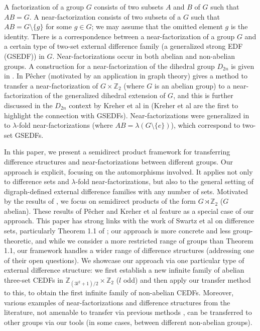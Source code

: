 \documentclass[12pt, a4paper]{article}
\theoremstyle{definition}
\begin{document}
A factorization of a group $G$ consists of two subsets $A$ and $B$ of $G$ such that $AB=G$. A near-factorization consists of two subsets of a $G$ such that $AB=G \setminus \{g\}$ for some $g \in G$; we may assume that the omitted element $g$ is the identity. There is a correspondence between a near-factorization of a group $G$ and a certain type of two-set external difference family (a generalized strong EDF (GSEDF)) in $G$.  Near-factorizations occur in both abelian and non-abelian groups.  A construction for a near-factorization of the dihedral group $D_{2n}$ is given in \cite{Caen}. In \cite{Pec} P\^{e}cher (motivated by an application in graph theory) gives a method to transfer a near-factorization of $G \times \mathbb{Z}_2$ (where $G$ is an abelian group) to a near-factorization of the generalized dihedral extension of $G$, and this is further discussed in the $D_{2n}$ context by Kreher et al in \cite{KrePatSti} (Kreher et al are the first to highlight the connection with GSEDFs). Near-factorizations were generalized in \cite{KreLiSti} to $\lambda$-fold near-factorizations (where $AB=\lambda(G \setminus \{e\})$), which correspond to two-set GSEDFs.

In this paper, we present a semidirect product framework for transferring difference structures and near-factorizations between different groups.  Our approach is explicit, focusing on the automorphisms involved.  It applies not only to difference sets and $\lambda$-fold near-factorizations, but also to the general setting of digraph-defined external difference families with any number of sets.   Motivated by the results of \cite{KrePatSti,Pec}, we focus on semidirect products of the form $G \rtimes \mathbb{Z}_2$ ($G$ abelian).  These results of P\^{e}cher and Kreher et al feature as a special case of our approach. This paper has strong links with the work of Swartz et al on difference sets, particularly Theorem 1.1 of \cite{Swa}; our approach is more concrete and less group-theoretic, and while we consider a more restricted range of groups than Theorem 1.1, our framework handles a wider range of difference structures (addressing one of their open questions).  We showcase our approach via one particular type of external difference structure: we first establish a new infinite family of abelian three-set CEDFs in $\mathbb{Z}_{(3l^2+1)/2} \times \mathbb{Z}_2$ ($l$ odd) and then apply our transfer method to this, to obtain the first infinite family of non-abelian CEDFs.  Moreover, various examples of near-factorizations and difference structures from the literature, not amenable to transfer via previous methods \cite{KreLiSti, KrePatSti, Pec}, can be transferred to other groups via our tools (in some cases, between different non-abelian groups). 
\end{document}
